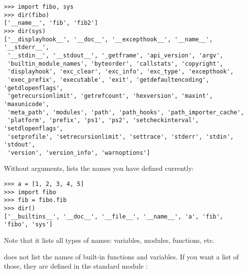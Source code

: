\documentclass{manual}
\begin{document}
\begin{verbatim}
>>> import fibo, sys
>>> dir(fibo)
['__name__', 'fib', 'fib2']
>>> dir(sys)
['__displayhook__', '__doc__', '__excepthook__', '__name__', '__stderr__',
 '__stdin__', '__stdout__', '_getframe', 'api_version', 'argv', 
 'builtin_module_names', 'byteorder', 'callstats', 'copyright',
 'displayhook', 'exc_clear', 'exc_info', 'exc_type', 'excepthook',
 'exec_prefix', 'executable', 'exit', 'getdefaultencoding', 'getdlopenflags',
 'getrecursionlimit', 'getrefcount', 'hexversion', 'maxint', 'maxunicode',
 'meta_path', 'modules', 'path', 'path_hooks', 'path_importer_cache',
 'platform', 'prefix', 'ps1', 'ps2', 'setcheckinterval', 'setdlopenflags',
 'setprofile', 'setrecursionlimit', 'settrace', 'stderr', 'stdin', 'stdout',
 'version', 'version_info', 'warnoptions']
\end{verbatim}

Without arguments,  lists the names you have defined
currently:

\begin{verbatim}
>>> a = [1, 2, 3, 4, 5]
>>> import fibo
>>> fib = fibo.fib
>>> dir()
['__builtins__', '__doc__', '__file__', '__name__', 'a', 'fib', 'fibo', 'sys']
\end{verbatim}

Note that it lists all types of names: variables, modules, functions, etc.

 does not list the names of built-in functions and
variables.  If you want a list of those, they are defined in the
standard module :
\end{document}
